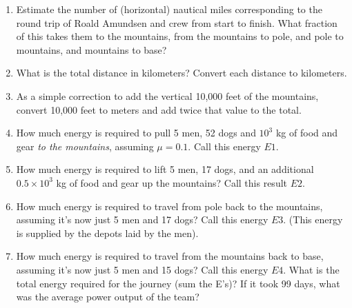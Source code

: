 \documentclass{article}
\begin{document}
\begin{enumerate}
\item Estimate the number of (horizontal) nautical miles corresponding to the round trip of Roald Amundsen and crew from start to finish. What fraction of this takes them to the mountains, from the mountains to pole, and pole to mountains, and mountains to base? \\ \vspace{0.75cm}
\item What is the total distance in kilometers?  Convert each distance to kilometers. \vspace{0.75cm}
\item As a simple correction to add the vertical 10,000 feet of the mountains, convert 10,000 feet to meters and add twice that value to the total. \vspace{0.75cm}
\item How much energy is required to pull 5 men, 52 dogs and $10^3$ kg of food and gear \textit{to the mountains}, assuming $\mu = 0.1$.  Call this energy $E1$. \vspace{0.75cm}
\item How much energy is required to lift 5 men, 17 dogs, and an additional $0.5 \times 10^3$ kg of food and gear up the mountains? Call this result $E2$.  \vspace{0.75cm}
\item How much energy is required to travel from pole back to the mountains, assuming it's now just 5 men and 17 dogs?  Call this energy $E3$.  (This energy is supplied by the depots laid by the men). \vspace{0.75cm}
\item How much energy is required to travel from the mountains back to base, assuming it's now just 5 men and 15 dogs?  Call this energy $E4$. What is the total energy required for the journey (sum the E's)?  If it took 99 days, what was the average power output of the team?
\end{enumerate}
\end{document}
